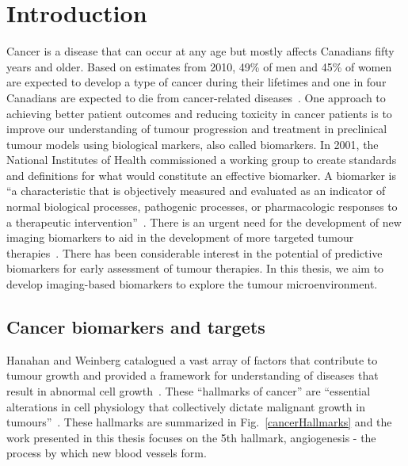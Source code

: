 
\chapter{Introduction}
\label{ch:Introduction}

Cancer is a disease that can occur at any age but mostly affects Canadians fifty years and older.
Based on estimates from 2010, 49\% of men and 45\% of women are expected to develop a type of cancer during their lifetimes and one in four Canadians are expected to die from cancer-related diseases~\cite{CancerSociety:2018tv}.
One approach to achieving better patient outcomes and reducing toxicity in cancer patients is to improve our understanding of tumour progression and treatment in preclinical tumour models using biological markers, also called biomarkers.
In 2001, the National Institutes of Health commissioned a working group to create standards and definitions for what would constitute an effective biomarker. 
A biomarker is ``a characteristic that is objectively measured and evaluated as an indicator of normal biological processes, pathogenic processes, or pharmacologic responses to a therapeutic intervention''~\cite{BiomarkersDefinitionsWorkingGroup:2001gd}.  
There is an urgent need for the development of new imaging biomarkers to aid in the development of more targeted tumour therapies~\cite{vanderMeel:2010cb}.
There has been considerable interest in the potential of predictive biomarkers for early assessment of tumour therapies. 
In this thesis, we aim to develop imaging-based biomarkers to explore the tumour microenvironment.

\section{Cancer biomarkers and targets} 

Hanahan and Weinberg catalogued a vast array of factors that contribute to tumour growth and provided a framework for understanding of diseases that result in abnormal cell growth~\cite{Hanahan:2000wo,Hanahan:2011gu}.
These ``hallmarks of cancer'' are ``essential alterations in cell physiology that collectively dictate malignant growth in tumours''~\cite{Hanahan:2000wo}.
These hallmarks are summarized in Fig.~\ref{cancerHallmarks} and the  work presented in this thesis focuses on the 5th hallmark, angiogenesis - the process by which new blood vessels form.

